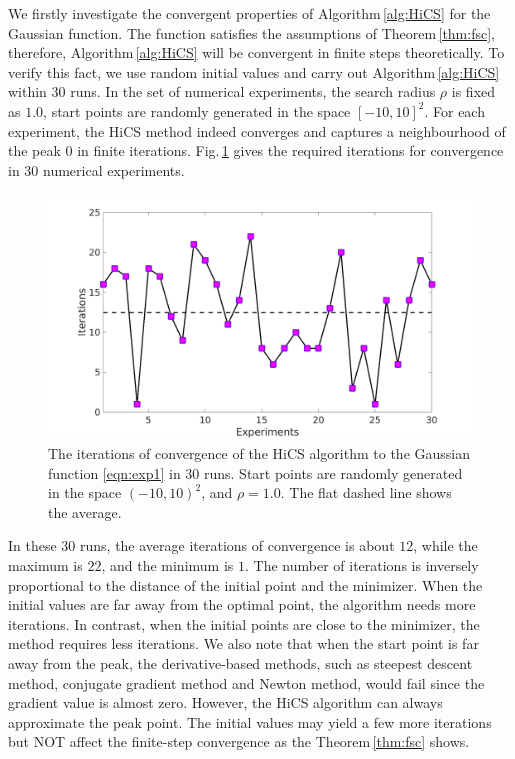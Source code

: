 \documentclass[final,1p,times]{elsarticle}
\begin{document}
We firstly investigate the convergent properties of
Algorithm\,\ref{alg:HiCS} for the Gaussian function. 
The function satisfies the assumptions of
Theorem\,\ref{thm:fsc}, therefore, Algorithm\,\ref{alg:HiCS} will
be convergent in finite steps theoretically.
To verify this fact, we use random initial values and carry out
Algorithm\,\ref{alg:HiCS} within $30$ runs.
In the set of numerical experiments, 
the search radius $\rho$ is fixed as $1.0$, start points are
randomly generated in the space $[-10, 10]^2$. For each
experiment, the HiCS method indeed converges and
captures a neighbourhood of the peak
$0$ in finite iterations. Fig.\,\ref{fig:exp1:randInit} gives
the required iterations for convergence in $30$ numerical experiments.
\begin{figure}[!htbp]
	\centering
	  \includegraphics[scale=0.3]{../figures/gauss2Drand.png}
	  \caption{The iterations of convergence of the 
	  HiCS algorithm to the Gaussian function
	  \eqref{eqn:exp1} in $30$ runs. Start points are randomly
	  generated in the space $(-10, 10)^2$, and $\rho=1.0$. 
	  The flat dashed line shows the average.} 
	  \label{fig:exp1:randInit}
\end{figure}
In these $30$ runs, the average iterations of convergence is
about $12$, while the maximum is $22$, and the minimum is $1$.
The number of iterations is inversely proportional to the
distance of the initial point and the minimizer.
When the initial values are far away from the optimal point, the
algorithm needs more iterations. In contrast, when the initial
points are close to the minimizer, the method requires less iterations. 
We also note that when the start point is far away from the peak,
the derivative-based methods, such as steepest descent method,
conjugate gradient method and Newton method, would fail since the
gradient value is almost zero. 
However, the HiCS algorithm can always approximate the
peak point. The initial values may yield a few more iterations
but NOT affect the finite-step convergence as the
Theorem\,\ref{thm:fsc} shows.
\end{document}
